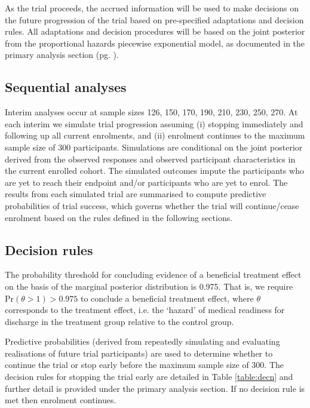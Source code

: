 \documentclass[a4paper]{article}
\begin{document}
As the trial proceeds, the accrued information will be used to make decisions on the future progression of the trial based on pre-specified adaptations and decision rules.
All adaptations and decision procedures will be based on the joint posterior from the proportional hazards piecewise exponential model, as documented in the primary analysis section (pg. \pageref{primary-analysis}).

\subsection{Sequential analyses}

Interim analyses occur at sample sizes 126, 150, 170, 190, 210, 230, 250, 270.
At each interim we simulate trial progression assuming (i) stopping immediately and following up all current enrolments, and (ii) enrolment continues to the maximum sample size of 300 participants.
Simulations are conditional on the joint posterior derived from the observed responses and observed participant characteristics in the current enrolled cohort.
The simulated outcomes impute the participants who are yet to reach their endpoint and/or participants who are yet to enrol.
The results from each simulated trial are summarised to compute predictive probabilities of trial success, which governs whether the trial will continue/cease enrolment based on the rules defined in the following sections.

\subsection{Decision rules}

The probability threshold for concluding evidence of a beneficial treatment effect on the basis of the marginal posterior distribution is 0.975.
That is, we require $\text{Pr}(\theta > 1) > 0.975$ to conclude a beneficial treatment effect, where $\theta$ corresponds to the treatment effect, i.e. the `hazard' of medical readiness for discharge in the treatment group relative to the control group.

Predictive probabilities (derived from repeatedly simulating and evaluating realisations of future trial participants) are used to determine whether to continue the trial or stop early before the maximum sample size of 300. 
The decision rules for stopping the trial early are detailed in Table \ref{table:decn} and further detail is provided under the primary analysis section.
If no decision rule is met then enrolment continues.
\end{document}
